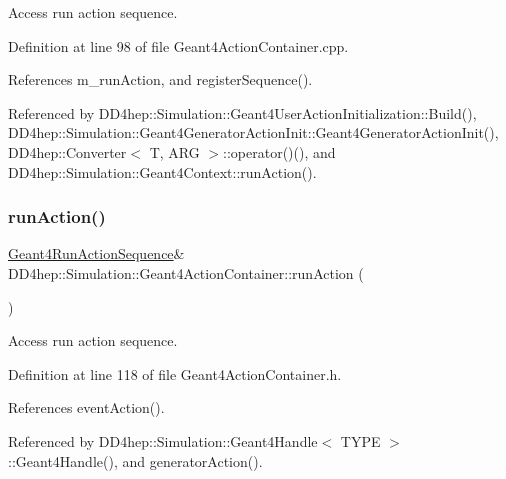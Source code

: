 Access run action sequence. 



Definition at line 98 of file Geant4\+Action\+Container.\+cpp.



References m\+\_\+run\+Action, and register\+Sequence().



Referenced by D\+D4hep\+::\+Simulation\+::\+Geant4\+User\+Action\+Initialization\+::\+Build(), D\+D4hep\+::\+Simulation\+::\+Geant4\+Generator\+Action\+Init\+::\+Geant4\+Generator\+Action\+Init(), D\+D4hep\+::\+Converter$<$ T, A\+R\+G $>$\+::operator()(), and D\+D4hep\+::\+Simulation\+::\+Geant4\+Context\+::run\+Action().

\hypertarget{class_d_d4hep_1_1_simulation_1_1_geant4_action_container_adff65baf436f870b8cc2e9ffd8844e7a}{}\label{class_d_d4hep_1_1_simulation_1_1_geant4_action_container_adff65baf436f870b8cc2e9ffd8844e7a} 
\subsubsection{\texorpdfstring{run\+Action()}{runAction()}\hspace{0.1cm}{\footnotesize\ttfamily [2/2]}}
{\footnotesize\ttfamily \hyperlink{class_d_d4hep_1_1_simulation_1_1_geant4_run_action_sequence}{Geant4\+Run\+Action\+Sequence}\& D\+D4hep\+::\+Simulation\+::\+Geant4\+Action\+Container\+::run\+Action (\begin{DoxyParamCaption}{ }\end{DoxyParamCaption})\hspace{0.3cm}{\ttfamily [inline]}}



Access run action sequence. 



Definition at line 118 of file Geant4\+Action\+Container.\+h.



References event\+Action().



Referenced by D\+D4hep\+::\+Simulation\+::\+Geant4\+Handle$<$ T\+Y\+P\+E $>$\+::\+Geant4\+Handle(), and generator\+Action().

\hypertarget{class_d_d4hep_1_1_simulation_1_1_geant4_action_container_a9e52e2e6655f19963fc07b86cc483928}{}\label{class_d_d4hep_1_1_simulation_1_1_geant4_action_container_a9e52e2e6655f19963fc07b86cc483928} 
